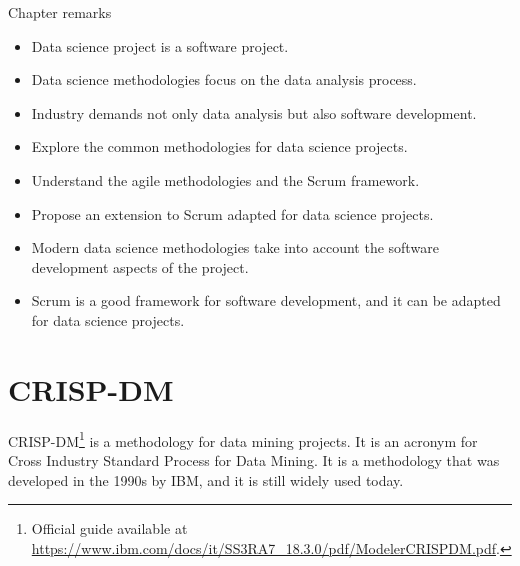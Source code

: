 \begin{mainbox}{Chapter remarks}


  \startcontents[chapters]
  \vspace{1em}


  \begin{itemize}
    \itemsep0em
    \item Data science project is a software project.
    \item Data science methodologies focus on the data analysis process.
    \item Industry demands not only data analysis but also software development.
  \end{itemize}


  \begin{itemize}
    \itemsep0em
    \item Explore the common methodologies for data science projects.
    \item Understand the agile methodologies and the Scrum framework.
    \item Propose an extension to Scrum adapted for data science projects.
  \end{itemize}


  \begin{itemize}
    \itemsep0em
    \item Modern data science methodologies take into account the software development aspects of the
      project.
    \item Scrum is a good framework for software development, and it can be adapted for
      data science projects.
  \end{itemize}
\end{mainbox}

{}
\clearpage

\section{CRISP-DM}

CRISP-DM\footnote{Official guide available at
\url{https://www.ibm.com/docs/it/SS3RA7_18.3.0/pdf/ModelerCRISPDM.pdf}.} is a methodology
for data mining projects.  It is an acronym for Cross Industry Standard Process for Data
Mining.  It is a methodology that was developed in the 1990s by IBM, and it is still
widely used today.

